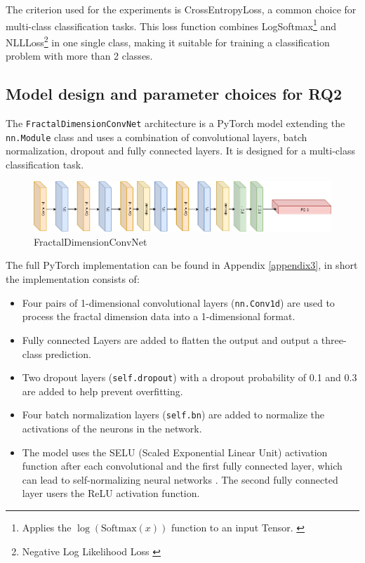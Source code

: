 The criterion used for the experiments is CrossEntropyLoss, a common choice for multi-class classification tasks. This loss function combines LogSoftmax\footnote{Applies the $\log (\text{Softmax} (x))$ function to an input Tensor. \citep{miranda2017softmax}} and NLLLoss\footnote{Negative Log Likelihood Loss \citep{miranda2017softmax}} in one single class, making it suitable for training a classification problem with more than 2 classes. 
\newpage
\subsection{Model design and parameter choices for RQ2}
\label{model_rq2}
The \verb|FractalDimensionConvNet| architecture is a PyTorch model extending the \newline \verb|nn.Module| class and uses a combination of convolutional layers, batch normalization, dropout and fully connected layers. It is designed for a multi-class classification task. 
\begin{figure}[H]
    \centering
    \includegraphics[width=1.0\textwidth]{Grad Assignment/Images/FD_architecture.drawio.png}
    \caption{FractalDimensionConvNet}
    \label{fig:FractalDimensionConvNet}
\end{figure}
The full PyTorch implementation can be found in Appendix \ref{appendix3}, in short the implementation consists of:
\begin{itemize}
    \item Four pairs of 1-dimensional convolutional layers (\verb|nn.Conv1d|) are used to process the fractal dimension data into a 1-dimensional format. 
    \item Fully connected Layers are added to flatten the output and output a three-class prediction. 
    \item Two dropout layers (\verb|self.dropout|) with a dropout probability of 0.1 and 0.3 are added to help prevent overfitting. 
    \item Four batch normalization layers (\verb|self.bn|) are added to normalize the activations of the neurons in the network. 
    \item The model uses the SELU (Scaled Exponential Linear Unit) activation function after each convolutional and the first fully connected layer, which can lead to self-normalizing neural networks \citep{rasamoelina2020review, kiliccarslan2021overview}. The second fully connected layer users the ReLU activation function. 
\end{itemize}


